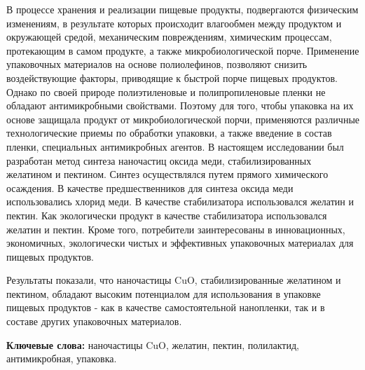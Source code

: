 В процессе хранения и реализации пищевые продукты, подвергаются
физическим изменениям, в результате которых происходит влагообмен между
продуктом и окружающей средой, механическим повреждениям, химическим
процессам, протекающим в самом продукте, а также микробиологической
порче. Применение упаковочных материалов на основе полиолефинов,
позволяют снизить воздействующие факторы, приводящие к быстрой порче
пищевых продуктов. Однако по своей природе полиэтиленовые и
полипропиленовые пленки не обладают антимикробными свойствами. Поэтому
для того, чтобы упаковка на их основе защищала продукт от
микробиологической порчи, применяются различные технологические приемы
по обработки упаковки, а также введение в состав пленки, специальных
антимикробных агентов. В настоящем исследовании был разработан метод
синтеза наночастиц оксида меди, стабилизированных желатином и пектином.
Синтез осуществлялся путем прямого химического осаждения. В качестве
предшественников для синтеза оксида меди использовались хлорид меди. В
качестве стабилизатора использовался желатин и пектин. Как экологически
продукт в качестве стабилизатора использовался желатин и пектин. Кроме
того, потребители заинтересованы в инновационных, экономичных,
экологически чистых и эффективных упаковочных материалах для пищевых
продуктов.

Результаты показали, что наночастицы CuO, стабилизированные желатином и
пектином, обладают высоким потенциалом для использования в упаковке
пищевых продуктов - как в качестве самостоятельной нанопленки, так и в
составе других упаковочных материалов.

{\bfseries Ключевые слова:} наночастицы CuO, желатин, пектин, полилактид,
антимикробная, упаковка.

